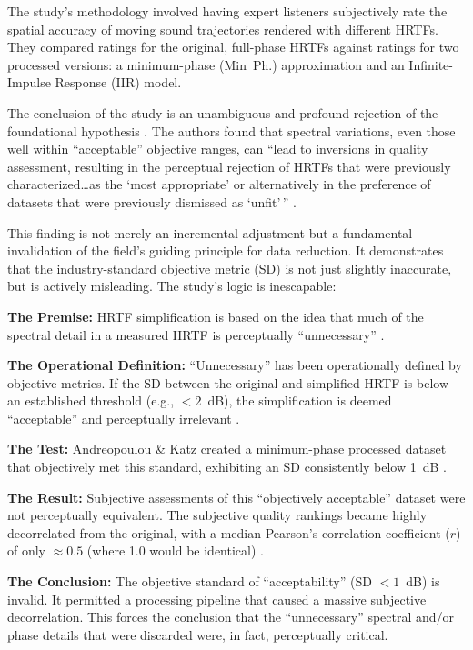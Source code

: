 \documentclass[12pt,a4paper]{article}
\begin{document}
The study's methodology involved having expert listeners subjectively rate the spatial accuracy of moving sound trajectories rendered with different HRTFs. They compared ratings for the original, full-phase HRTFs against ratings for two processed versions: a minimum-phase (Min~Ph.) approximation and an Infinite-Impulse Response (IIR) model.

The conclusion of the study is an unambiguous and profound rejection of the foundational hypothesis \cite{andreopoulou2022}. The authors found that spectral variations, even those well within ``acceptable'' objective ranges, can ``lead to inversions in quality assessment, resulting in the perceptual rejection of HRTFs that were previously characterized\ldots as the `most appropriate' or alternatively in the preference of datasets that were previously dismissed as `unfit'\,'' \cite{andreopoulou2022}.

This finding is not merely an incremental adjustment but a fundamental invalidation of the field's guiding principle for data reduction. It demonstrates that the industry-standard objective metric (SD) is not just slightly inaccurate, but is actively misleading. The study's logic is inescapable:

\textbf{The Premise:} HRTF simplification is based on the idea that much of the spectral detail in a measured HRTF is perceptually ``unnecessary'' \cite{andreopoulou2022}.

\textbf{The Operational Definition:} ``Unnecessary'' has been operationally defined by objective metrics. If the SD between the original and simplified HRTF is below an established threshold (e.g., $< 2$~dB), the simplification is deemed ``acceptable'' and perceptually irrelevant \cite{andreopoulou2022}.

\textbf{The Test:} Andreopoulou \& Katz created a minimum-phase processed dataset that objectively met this standard, exhibiting an SD consistently below 1~dB \cite{andreopoulou2022}.

\textbf{The Result:} Subjective assessments of this ``objectively acceptable'' dataset were not perceptually equivalent. The subjective quality rankings became highly decorrelated from the original, with a median Pearson's correlation coefficient ($r$) of only $\approx 0.5$ (where 1.0 would be identical) \cite{andreopoulou2022}.

\textbf{The Conclusion:} The objective standard of ``acceptability'' (SD $< 1$~dB) is invalid. It permitted a processing pipeline that caused a massive subjective decorrelation. This forces the conclusion that the ``unnecessary'' spectral and/or phase details that were discarded were, in fact, perceptually critical.
\end{document}
